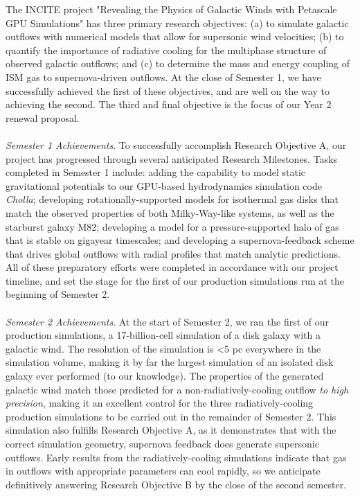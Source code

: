 \documentclass[11pt,letterpaper,english]{article}
\begin{document}
\vspace{.15in}
The INCITE project "Revealing the Physics of Galactic Winds with Petascale GPU Simulations" has three primary research objectives: (a) to simulate galactic outflows with numerical models that allow for supersonic wind velocities; (b) to quantify the importance of radiative cooling for the multiphase structure of observed galactic outflows; and (c) to determine the mass and energy coupling of ISM gas to supernova-driven outflows. At the close of Semester 1, we have successfully achieved the first of these objectives, and are well on the way to achieving the second. The third and final objective is the focus of our Year 2 renewal proposal.
~\\~\\
\textit{Semester 1 Achievements}. To successfully accomplish Research Objective A, our project has progressed through several anticipated Research Milestones. Tasks completed in Semester 1 include:  adding the capability to model static gravitational potentials to our GPU-based hydrodynamics simulation code \textit{Cholla}; developing rotationally-supported models for isothermal gas disks that match the observed properties of both Milky-Way-like systems, as well as the starburst galaxy M82; developing a model for a pressure-supported halo of gas that is stable on gigayear timescales; and developing a supernova-feedback scheme that drives global outflows with radial profiles that match analytic predictions. All of these preparatory efforts were completed in accordance with our project timeline, and set the stage for the first of our production simulations run at the beginning of Semester 2.
~\\~\\
\textit{Semester 2 Achievements}. At the start of Semester 2, we ran the first of our production simulations, a 17-billion-cell simulation of a disk galaxy with a galactic wind. The resolution of the simulation is <5 pc everywhere in the simulation volume, making it by far the largest simulation of an isolated disk galaxy ever performed (to our knowledge). The properties of the generated galactic wind match those predicted for a non-radiatively-cooling outflow \textit{to high precision}, making it an excellent control for the three radiatively-cooling production simulations to be carried out in the remainder of Semester 2. This simulation also fulfills Research Objective A, as it demonstrates that with the correct simulation geometry, supernova feedback does generate supersonic outflows. Early results from the radiatively-cooling simulations indicate that gas in outflows with appropriate parameters can cool rapidly, so we anticipate definitively answering Research Objective B by the close of the second semester.
\end{document}
